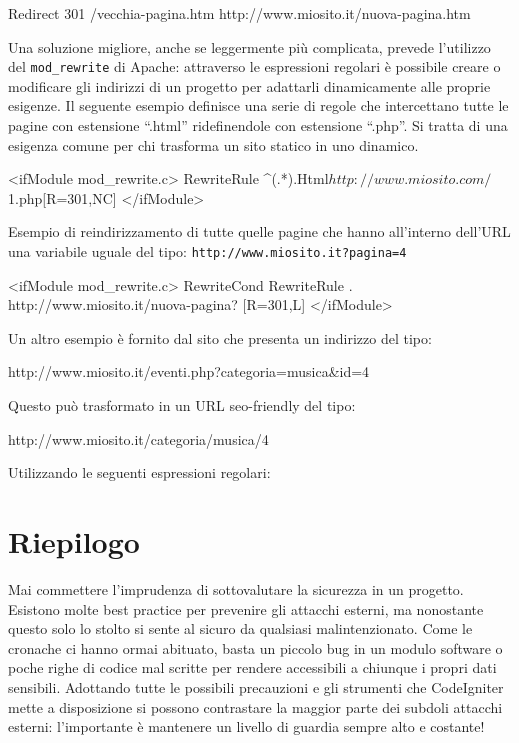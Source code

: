\begin{code}
Redirect 301 /vecchia-pagina.htm http://www.miosito.it/nuova-pagina.htm
\end{code}

Una soluzione migliore, anche se leggermente più complicata, prevede l'utilizzo del \verb|mod_rewrite| di Apache: attraverso le espressioni regolari è possibile creare o modificare gli indirizzi di un progetto per adattarli dinamicamente alle proprie esigenze. Il seguente esempio definisce una serie di regole che intercettano tutte le pagine con estensione ``.html'' ridefinendole con estensione ``.php''. Si tratta di una esigenza comune per chi trasforma un sito statico in uno dinamico.

\begin{code}
<ifModule mod_rewrite.c>
RewriteRule ^(.*).Html$ http://www.miosito.com/$1.php[R=301,NC]
</ifModule>
\end{code}

Esempio di reindirizzamento di tutte quelle pagine che hanno all'interno dell'\ac{URL} una variabile uguale del tipo: \verb|http://www.miosito.it?pagina=4|

\begin{code}
<ifModule mod_rewrite.c>
RewriteCond %
RewriteRule . http://www.miosito.it/nuova-pagina? [R=301,L]
</ifModule>
\end{code}

Un altro esempio è fornito dal sito che presenta un indirizzo del tipo:  

\begin{code}
http://www.miosito.it/eventi.php?categoria=musica&id=4
\end{code}

Questo può trasformato in un \ac{URL} seo-friendly del tipo:

\begin{code}
http://www.miosito.it/categoria/musica/4
\end{code}

Utilizzando le seguenti espressioni regolari:


\section*{Riepilogo}
Mai commettere l'imprudenza di sottovalutare la sicurezza in un progetto. Esistono molte best practice per prevenire gli attacchi esterni, ma nonostante questo solo lo stolto si sente al sicuro da qualsiasi malintenzionato. Come le cronache ci hanno ormai abituato, basta un piccolo bug in un modulo software o poche righe di codice mal scritte per rendere accessibili a chiunque i propri dati sensibili. Adottando tutte le possibili precauzioni e gli strumenti che CodeIgniter mette a disposizione si possono contrastare la maggior parte dei subdoli attacchi esterni: l'importante è mantenere un livello di guardia sempre alto e costante!